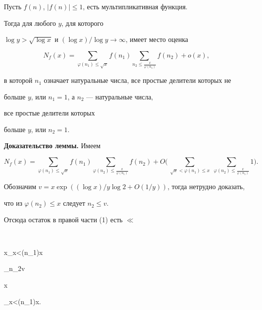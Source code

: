  


\begin{lemnonum} Пусть $f(n)$, $|f(n)|\le 1$, есть мультипликативная функция. 


Тогда для любого $y$, для которого 


$\log y>\sqrt{\log x}$ и $(\log x)/\log y\to \infty$, имеет место оценка 


$$ 


N_f(x)=\sum_{\varphi(n_1)\le\sqrt x}f(n_1) 


\sum_{n_2\le\frac{x}{\varphi(n_1)}}f(n_2)+o(x), 


$$ 


в которой $n_1$ означает натуральные числа, все простые делители которых не 


больше $y$, или $n_1=1$, а $n_2$ --- натуральные числа, 


все простые делители которых 


больше $y$, или $n_2=1$. 


\end{lemnonum}


 


{\bf Доказательство леммы.} Имеем 


% 


\begin{equation} 


N_f(x)=\sum_{\varphi(n_1)\le\sqrt x}f(n_1) 


\sum_{\varphi(n_2)\le\frac{x}{\varphi(n_1)}}f(n_2)+ 


O\biggl(\,\sum_{\sqrt x<\varphi(n_1)\le x} \;


\sum_{\varphi(n_2)\le\frac{x}{\varphi(n_1)}}1\biggr). 


\end{equation} 


% 


Обозначим $v=x\exp((\log x)/y\log 2+O(1/y))$, тогда нетрудно доказать, 


что из $\varphi(n_2)\le x$ следует $n_2\le v$.


Отсюда остаток в правой части (1) есть $\ll$ 


$$ 


x\sum_{\sqrt x<\varphi(n_1)\le x} 


\sum_{n_2\le v} \ll 


x 


\sum_{\sqrt x<\varphi(n_1)\le x}. 


